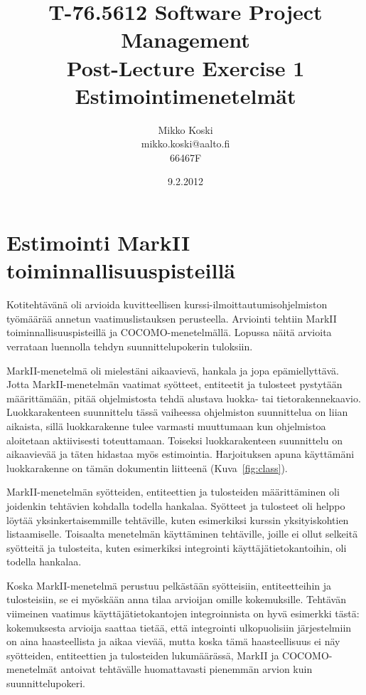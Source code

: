 \documentclass[a4paper]{article}
\begin{document}
\title{\small T-76.5612 Software Project Management \\ Post-Lecture Exercise 1 \\ \huge Estimointimenetelmät}
\date{9.2.2012}
\author{Mikko Koski \\ mikko.koski@aalto.fi \\ 66467F}
\maketitle

\normalsize

\section{Estimointi MarkII toiminnallisuuspisteillä}

Kotitehtävänä oli arvioida kuvitteellisen kurssi-ilmoittautumisohjelmiston työmäärää annetun vaatimuslistauksen perusteella. Arviointi tehtiin MarkII toiminnallisuuspisteillä ja COCOMO-menetelmällä. Lopussa näitä arvioita verrataan luennolla tehdyn suunnittelupokerin tuloksiin.

MarkII-menetelmä oli mielestäni aikaavievä, hankala ja jopa epämiellyttävä. Jotta MarkII-menetelmän vaatimat syötteet, entiteetit ja tulosteet pystytään määrittämään, pitää ohjelmistosta tehdä alustava luokka- tai tietorakennekaavio. Luokkarakenteen suunnittelu tässä vaiheessa ohjelmiston suunnittelua on liian aikaista, sillä luokkarakenne tulee varmasti muuttumaan kun ohjelmistoa aloitetaan aktiivisesti toteuttamaan. Toiseksi luokkarakenteen suunnittelu on aikaavievää ja täten hidastaa myös estimointia. Harjoituksen apuna käyttämäni luokkarakenne on tämän dokumentin liitteenä (Kuva~\ref{fig:class}).

MarkII-menetelmän syötteiden, entiteettien ja tulosteiden määrittäminen oli joidenkin tehtävien kohdalla todella hankalaa. Syötteet ja tulosteet oli helppo löytää yksinkertaisemmille tehtäville, kuten esimerkiksi kurssin yksityiskohtien listaamiselle. Toisaalta menetelmän käyttäminen tehtäville, joille ei ollut selkeitä syötteitä ja tulosteita, kuten esimerkiksi integrointi käyttäjätietokantoihin, oli todella hankalaa.

Koska MarkII-menetelmä perustuu pelkästään syötteisiin, entiteetteihin ja tulosteisiin, se ei myöskään anna tilaa arvioijan omille kokemuksille. Tehtävän viimeinen vaatimus käyttäjätietokantojen integroinnista on hyvä esimerkki tästä: kokemuksesta arvioija saattaa tietää, että integrointi ulkopuolisiin järjestelmiin on aina haasteellista ja aikaa vievää, mutta koska tämä haasteellisuus ei näy syötteiden, entiteettien ja tulosteiden lukumäärässä, MarkII ja COCOMO-menetelmät antoivat tehtävälle huomattavasti pienemmän arvion kuin suunnittelupokeri.
\end{document}
